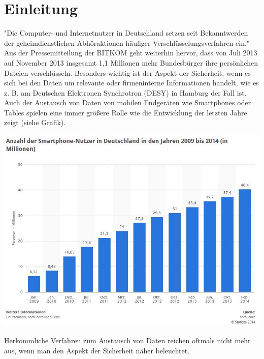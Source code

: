 \documentclass[10pt, a4paper]{scrreprt}
\begin{document}
\chapter{Einleitung}
"Die Computer- und Internetnutzer in Deutschland setzen seit Bekanntwerden der geheimdienstlichen Abhöraktionen häufiger Verschlüsselungsverfahren ein." %
Aus der Pressemitteilung der BITKOM geht weiterhin hervor, dass von Juli 2013 auf November 2013 insgesamt 1,1 Millionen mehr Bundesbürger ihre persönlichen Dateien verschlüsseln. Besonders wichtig ist der Aspekt der Sicherheit, wenn es sich bei den Daten um relevante oder firmeninterne Informationen handelt, wie es z. B. am Deutschen Elektronen Synchrotron (DESY) in Hamburg der Fall ist. Auch der Austausch von Daten von mobilen Endgeräten wie Smartphones oder Tables spielen eine immer größere Rolle wie die Entwicklung der letzten Jahre zeigt (siehe Grafik). \\ 
\begin{center}
\includegraphics[scale=0.6]{smartphoneUser_Germany.JPG} %
\end{center}
Herkömmliche Verfahren zum Austausch von Daten reichen oftmals nicht mehr aus, wenn man den Aspekt der Sicherheit näher beleuchtet. %
\end{document}
